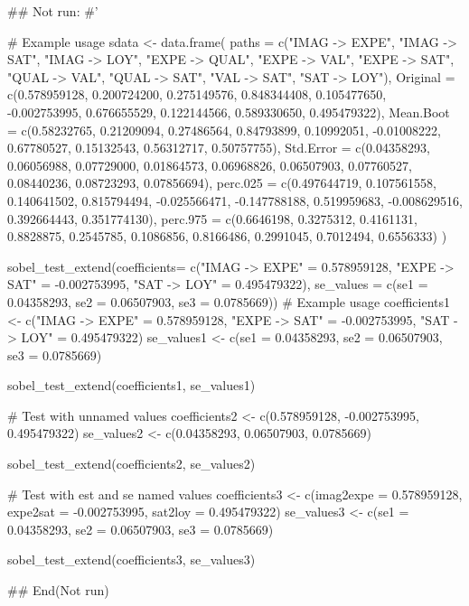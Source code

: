 \documentclass[a4paper]{book}
\begin{document}
\begin{Examples}
\begin{ExampleCode}

## Not run: 
#'

# Example usage
sdata <- data.frame(
  paths = c("IMAG -> EXPE", "IMAG -> SAT",
              "IMAG -> LOY", "EXPE -> QUAL", "EXPE -> VAL", "EXPE -> SAT",
            "QUAL -> VAL", "QUAL -> SAT", "VAL -> SAT", "SAT -> LOY"),
  Original = c(0.578959128, 0.200724200, 0.275149576,
              0.848344408, 0.105477650, -0.002753995,
               0.676655529, 0.122144566, 0.589330650, 0.495479322),
  Mean.Boot = c(0.58232765, 0.21209094, 0.27486564,
                0.84793899, 0.10992051, -0.01008222,
                0.67780527, 0.15132543, 0.56312717, 0.50757755),
  Std.Error = c(0.04358293, 0.06056988, 0.07729000,
                 0.01864573, 0.06968826, 0.06507903,
                0.07760527, 0.08440236, 0.08723293, 0.07856694),
  perc.025 = c(0.497644719, 0.107561558, 0.140641502,
                0.815794494, -0.025566471, -0.147788188,
               0.519959683, -0.008629516, 0.392664443, 0.351774130),
  perc.975 = c(0.6646198, 0.3275312, 0.4161131,
                0.8828875, 0.2545785, 0.1086856,
               0.8166486, 0.2991045, 0.7012494, 0.6556333)
)



sobel_test_extend(coefficients= c("IMAG -> EXPE" = 0.578959128,
                                  "EXPE -> SAT" = -0.002753995,
                                  "SAT -> LOY" = 0.495479322),
                  se_values = c(se1 = 0.04358293,
                                se2 = 0.06507903,
                                se3 = 0.0785669))
# Example usage
coefficients1 <- c("IMAG -> EXPE" = 0.578959128,
                  "EXPE -> SAT" = -0.002753995, "SAT -> LOY" = 0.495479322)
se_values1 <- c(se1 = 0.04358293, se2 = 0.06507903, se3 = 0.0785669)

sobel_test_extend(coefficients1, se_values1)


# Test with unnamed values
coefficients2 <- c(0.578959128, -0.002753995, 0.495479322)
se_values2 <- c(0.04358293, 0.06507903, 0.0785669)

sobel_test_extend(coefficients2, se_values2)


# Test with est and se named values
coefficients3 <- c(imag2expe = 0.578959128,
                  expe2sat = -0.002753995, sat2loy = 0.495479322)
se_values3 <- c(se1 = 0.04358293, se2 = 0.06507903, se3 = 0.0785669)

sobel_test_extend(coefficients3, se_values3)




## End(Not run)


\end{ExampleCode}
\end{Examples}
\end{document}
